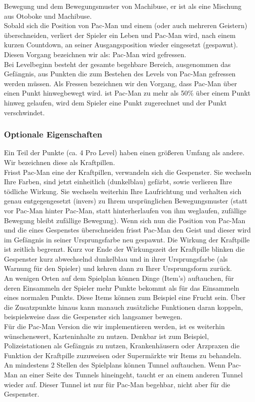 \documentclass{article}
\begin{document}
Bewegung und dem Bewegungsmuster von Machibuse, er ist als eine Mischung
aus Otoboke und Machibuse.\\
Sobald sich die Position von Pac-Man und einem (oder auch mehreren
Geistern) überschneiden, verliert der Spieler ein Leben und Pac-Man
wird, nach einem kurzen Countdown, an seiner Ausgangsposition wieder
eingesetzt (gespawnt). Diesen Vorgang bezeichnen wir als: Pac-Man wird
gefressen. \\
Bei Levelbeginn besteht der gesamte begehbare Bereich, ausgenommen das
Gefängnis, aus Punkten die zum Bestehen des Levels von Pac-Man gefressen
werden müssen. Als Fressen bezeichnen wir den Vorgang, dass Pac-Man über
einen Punkt hinwegbewegt wird. ist Pac-Man zu mehr als 50\% über einem
Punkt hinweg gelaufen, wird dem Spieler eine Punkt zugerechnet und der
Punkt verschwindet.\\
\subsubsection{Optionale Eigenschaften}
Ein Teil der Punkte (ca. 4 Pro Level) haben einen größeren Umfang als andere. Wir bezeichnen diese als Kraftpillen.\\
Frisst Pac-Man eine der Kraftpillen, verwandeln sich die Gespenster. Sie wechseln Ihre Farben, sind jetzt einheitlich (dunkelblau) gefärbt, sowie verlieren Ihre tödliche Wirkung. Sie wechseln weiterhin Ihre Laufrichtung und verhalten sich genau entgegengesetzt (invers) zu Ihrem ursprünglichen Bewegungsmuster (statt vor Pac-Man hinter Pac-Man, statt hinterherlaufen von ihm weglaufen, zufällige Bewegung bleibt zufällige
Bewegung). Wenn sich nun die Position von Pac-Man und die eines
Gespenstes überschneiden frisst Pac-Man den Geist und dieser wird im
Gefängnis in seiner Ursprungsfarbe neu gespawnt. Die Wirkung der
Kraftpille ist zeitlich begrenzt. Kurz vor Ende der Wirkungszeit der
Kraftpille blinken die Gespenster kurz abwechselnd dunkelblau und in
ihrer Ursprungsfarbe (als Warnung für den Spieler) und kehren dann zu
Ihrer Ursprungsform zurück.\\
An wenigen Orten auf dem Spielplan können Dinge (Item's) auftauchen, für
deren Einsammeln der Spieler mehr Punkte bekommt als für das Einsammeln
eines normalen Punkts. Diese Items können zum Beispiel eine Frucht sein.
Über die Zusatzpunkte hinaus kann manauch zusätzliche Funktionen daran
koppeln, beispielsweise dass die Gespenster sich langsamer bewegen.\\
Für die Pac-Man Version die wir implementieren werden, ist es weiterhin
wünschenswert, Karteninhalte zu nutzen. Denkbar ist zum Beispiel,
Polizeistationen als Gefängnis zu nutzen, Krankenhäusern oder Arzpraxen
die Funktion der Kraftpille zuzuweisen oder Supermärkte wir Items zu
behandeln.\\
An mindestens 2 Stellen des Spielplans können Tunnel auftauchen. Wenn
Pac-Man an einer Seite des Tunnels hineingeht, taucht er an einem
anderen Tunnel wieder auf. Dieser Tunnel ist nur für Pac-Man begehbar,
nicht aber für die Gespenster.\\
\end{document}
